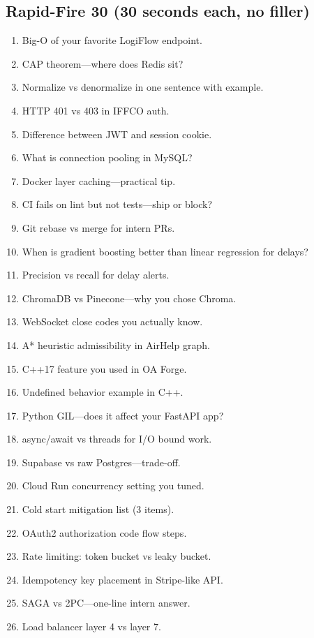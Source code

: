 \documentclass[9pt,a4paper]{article}
\begin{document}
\subsection{Rapid-Fire 30 (30 seconds each, no filler)}
\begin{enumerate}
  \item Big-O of your favorite LogiFlow endpoint.
  \item CAP theorem---where does Redis sit?
  \item Normalize vs denormalize in one sentence with example.
  \item HTTP 401 vs 403 in IFFCO auth.
  \item Difference between JWT and session cookie.
  \item What is connection pooling in MySQL?
  \item Docker layer caching---practical tip.
  \item CI fails on lint but not tests---ship or block?
  \item Git rebase vs merge for intern PRs.
  \item When is gradient boosting better than linear regression for delays?
  \item Precision vs recall for delay alerts.
  \item ChromaDB vs Pinecone---why you chose Chroma.
  \item WebSocket close codes you actually know.
  \item A* heuristic admissibility in AirHelp graph.
  \item C++17 feature you used in OA Forge.
  \item Undefined behavior example in C++.
  \item Python GIL---does it affect your FastAPI app?
  \item async/await vs threads for I/O bound work.
  \item Supabase vs raw Postgres---trade-off.
  \item Cloud Run concurrency setting you tuned.
  \item Cold start mitigation list (3 items).
  \item OAuth2 authorization code flow steps.
  \item Rate limiting: token bucket vs leaky bucket.
  \item Idempotency key placement in Stripe-like API.
  \item SAGA vs 2PC---one-line intern answer.
  \item Load balancer layer 4 vs layer 7.

\end{enumerate}
\end{document}
